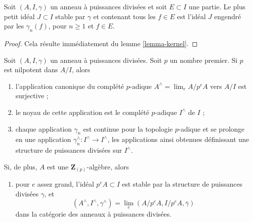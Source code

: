 \begin{lemma}

\label{lemma-sub-dp-ideal}
Soit $(A, I, \gamma)$ un anneau à puissances divisées et soit $E \subset I$ une partie. Le plus petit idéal $J \subset I$ stable par $\gamma$ et contenant tous les $f \in E$ est l'idéal $J$ engendré par les $\gamma_n(f)$, pour $n \geq 1$ et $f \in E$.
\end{lemma}

\begin{proof}
Cela résulte immédiatement du lemme \ref{lemma-kernel}.
\end{proof}

\begin{lemma}

\label{lemma-extend-to-completion}

Soit $(A, I, \gamma)$ un anneau à puissances divisées. Soit $p$ un nombre premier. Si $p$ est nilpotent dans $A/I$, alors

\begin{enumerate}

\item l'application canonique du complété $p$-adique $A^\wedge = \lim_e A/p^eA$ vers $A/I$ est surjective ;
\item le noyau de cette application est le complété $p$-adique $I^\wedge$ de $I$ ;
\item chaque application $\gamma_n$ est continue pour la topologie $p$-adique et se prolonge en une application $\gamma_n^\wedge : I^\wedge \to I^\wedge$, les applications ainsi obtenues définissant une structure de puissances divisées sur $I^\wedge$.

\end{enumerate}

Si, de plus, $A$ est une $\mathbf{Z}_{(p)}$-algèbre, alors

\begin{enumerate}

\item[(4)] pour $e$ assez grand, l'idéal $p^eA \subset I$ est stable par la structure de puissances divisées $\gamma$, et
$$
(A^\wedge, I^\wedge, \gamma^\wedge) = \lim_e (A/p^eA, I/p^eA, \bar\gamma)
$$
dans la catégorie des anneaux à puissances divisées.

\end{enumerate}

\end{lemma}

